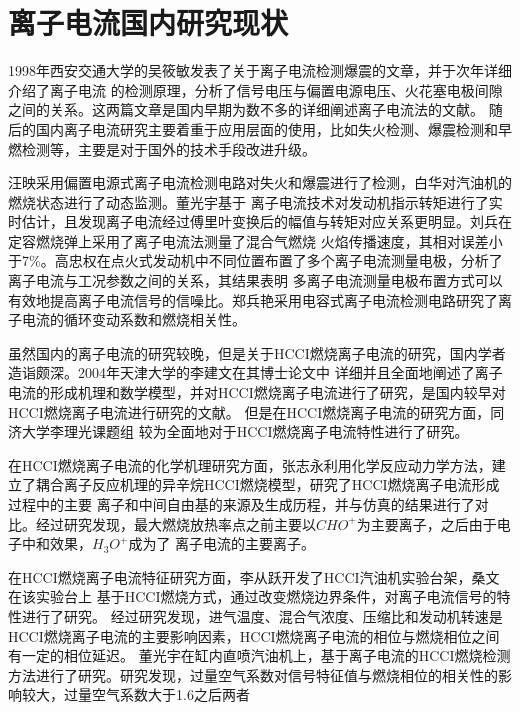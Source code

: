 \section{离子电流国内研究现状}
1998年西安交通大学的吴筱敏发表了关于离子电流检测爆震的文章\cite{wxm1998wxm}，并于次年详细介绍了离子电流
的检测原理\cite{wxm1999wxm}，分析了信号电压与偏置电源电压、火花塞电极间隙之间的关系。这两篇文章是国内早期为数不多的详细阐述离子电流法的文献。
随后的国内离子电流研究主要着重于应用层面的使用，比如失火检测、爆震检测和早燃检测等，主要是对于国外的技术手段改进升级。\par
汪映\cite{wy2002}采用偏置电源式离子电流检测电路对失火和爆震进行了检测，白华\cite{bh2007}对汽油机的燃烧状态进行了动态监测。董光宇\cite{dgy2008ys}基于
离子电流技术对发动机指示转矩进行了实时估计，且发现离子电流经过傅里叶变换后的幅值与转矩对应关系更明显。刘兵\cite{lb2015lcy}在定容燃烧弹上采用了离子电流法测量了混合气燃烧
火焰传播速度，其相对误差小于7\%。高忠权\cite{gzq2015lcy}在点火式发动机中不同位置布置了多个离子电流测量电极，分析了离子电流与工况参数之间的关系，其结果表明
多离子电流测量电极布置方式可以有效地提高离子电流信号的信噪比。郑兵艳\cite{zby2015}采用电容式离子电流检测电路研究了离子电流的循环变动系数和燃烧相关性。\par
虽然国内的离子电流的研究较晚，但是关于HCCI燃烧离子电流的研究，国内学者造诣颇深。2004年天津大学的李建文\cite{ljw2004phd}在其博士论文中
详细并且全面地阐述了离子电流的形成机理和数学模型，并对HCCI燃烧离子电流进行了研究，是国内较早对HCCI燃烧离子电流进行研究的文献。
但是在HCCI燃烧离子电流的研究方面，同济大学李理光课题组\cite{dgy2011,zqy2011,fqw2012,zzybh2012,cyb2013}
较为全面地对于HCCI燃烧离子电流特性进行了研究。\par
在HCCI燃烧离子电流的化学机理研究方面，张志永\cite{zzy2011hcci}利用化学反应动力学方法，建立了耦合离子反应机理的异辛烷HCCI燃烧模型，研究了HCCI燃烧离子电流形成过程中的主要
离子和中间自由基的来源及生成历程，并与仿真的结果进行了对比。经过研究发现，最大燃烧放热率点之前主要以$CHO^{+}$为主要离子，之后由于电子中和效果，$H_{3}O^{+}$成为了
离子电流的主要离子。\par
在HCCI燃烧离子电流特征研究方面，李从跃\cite{lcy2010hcci}开发了HCCI汽油机实验台架，桑文\cite{sangwen2010hcci}在该实验台上
基于HCCI燃烧方式，通过改变燃烧边界条件，对离子电流信号的特性进行了研究。
经过研究发现，进气温度、混合气浓度、压缩比和发动机转速是HCCI燃烧离子电流的主要影响因素，HCCI燃烧离子电流的相位与燃烧相位之间有一定的相位延迟。
董光宇\cite{dgy2011}在缸内直喷汽油机上，基于离子电流的HCCI燃烧检测方法进行了研究。研究发现，过量空气系数对信号特征值与燃烧相位的相关性的影响较大，过量空气系数大于1.6之后两者
